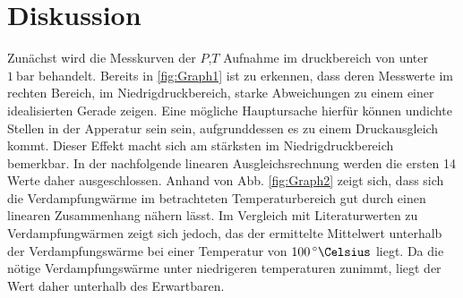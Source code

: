 
\section{Diskussion}
\label{sec:Diskussion}
Zunächst wird die Messkurven der $P$,$T$ Aufnahme im druckbereich von unter $\SI{1}{\bar}$
 behandelt. Bereits in \ref{fig:Graph1} ist zu erkennen, dass deren Messwerte im
  rechten Bereich, im Niedrigdruckbereich, starke Abweichungen zu einem einer
  idealisierten Gerade zeigen. Eine mögliche Hauptursache hierfür können
  undichte Stellen in der Apperatur sein sein, aufgrunddessen es zu einem
   Druckausgleich kommt. Dieser Effekt macht sich am stärksten im
   Niedrigdruckbereich bemerkbar. In der nachfolgende linearen Ausgleichsrechnung
    werden die ersten 14 Werte daher ausgeschlossen. Anhand von Abb.
     \ref{fig:Graph2} zeigt sich, dass sich die Verdampfungwärme im betrachteten
      Temperaturbereich gut durch einen linearen Zusammenhang nähern lässt. Im
      Vergleich mit Literaturwerten zu Verdampfungwärmen zeigt sich jedoch, das der
      ermittelte Mittelwert unterhalb der Verdampfungswärme bei einer
       Temperatur von $\SI{100}{\degree\Celsius}$ liegt. Da die nötige
       Verdampfungswärme unter niedrigeren temperaturen zunimmt, liegt der Wert
        daher unterhalb des Erwartbaren.
